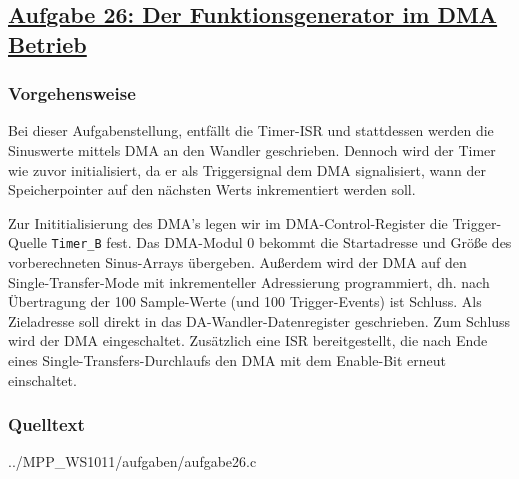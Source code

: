 \subsection
{\href{http://cst.mi.fu-berlin.de/intern/19606-P-MPP/Aufgaben/041001.html}
{Aufgabe 26: Der Funktionsgenerator im DMA Betrieb}}

\subsubsection*{Vorgehensweise}

Bei dieser Aufgabenstellung, entfällt die Timer-ISR und stattdessen
werden die Sinuswerte mittels DMA an den Wandler geschrieben. Dennoch 
wird der Timer wie zuvor initialisiert, da er als Triggersignal dem DMA
signalisiert, wann der Speicherpointer auf den nächsten Werts
inkrementiert werden soll.

Zur Inititialisierung des DMA's legen wir im DMA-Control-Register die
Trigger-Quelle {\tt Timer\_B} fest. Das DMA-Modul 0 bekommt die
Startadresse und Größe des vorberechneten Sinus-Arrays
übergeben. Außerdem wird der DMA auf den Single-Transfer-Mode mit
inkrementeller Adressierung programmiert, dh. nach Übertragung der 100
Sample-Werte (und 100 Trigger-Events) ist Schluss. Als Zieladresse
soll direkt in das DA-Wandler-Datenregister geschrieben. Zum Schluss
wird der DMA eingeschaltet. Zusätzlich eine ISR bereitgestellt, die nach
Ende eines Single-Transfers-Durchlaufs den DMA mit dem Enable-Bit
erneut einschaltet.

\subsubsection*{Quelltext}
 

{../MPP_WS1011/aufgaben/aufgabe26.c}

